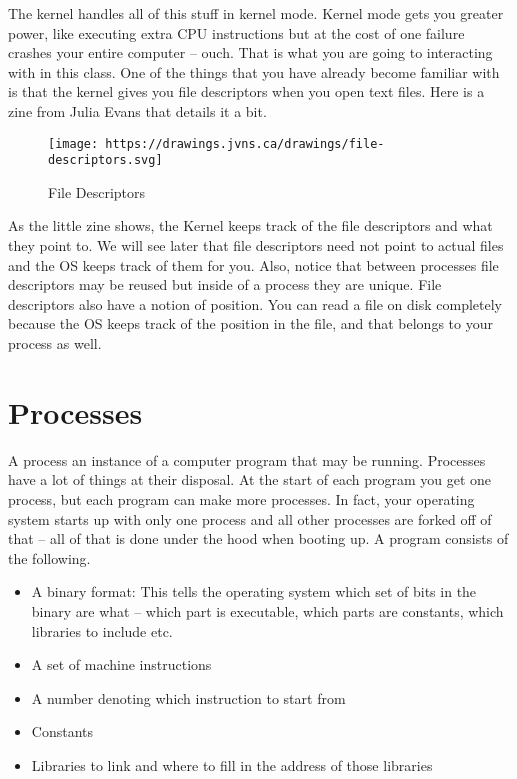 The kernel handles all of this stuff in kernel mode. Kernel mode gets you greater power, like executing extra CPU instructions but at the cost of one failure crashes your entire computer -- ouch. That is what you are going to interacting with in this class. One of the things that you have already become familiar with is that the kernel gives you file descriptors when you open text files. Here is a zine from Julia Evans that details it a bit.

\begin{figure}[htbp]
  \centering
  \texttt{[image: https://drawings.jvns.ca/drawings/file-descriptors.svg]}
  \caption{File Descriptors}
\end{figure}

As the little zine shows, the Kernel keeps track of the file descriptors and what they point to. We will see later that file descriptors need not point to actual files and the OS keeps track of them for you. Also, notice that between processes file descriptors may be reused but inside of a process they are unique. File descriptors also have a notion of position. You can read a file on disk completely because the OS keeps track of the position in the file, and that belongs to your process as well.

\section{Processes}

A process an instance of a computer program that may be running. Processes have a lot of things at their disposal. At the start of each program you get one process, but each program can make more processes. In fact, your operating system starts up with only one process and all other processes are forked off of that -- all of that is done under the hood when booting up. A program consists of the following.

\begin{itemize}
\item A binary format: This tells the operating system which set of bits in the binary are what -- which part is executable, which parts are constants, which libraries to include etc. 
\item A set of machine instructions 
\item A number denoting which instruction to start from
\item Constants
\item Libraries to link and where to fill in the address of those libraries
\end{itemize}

